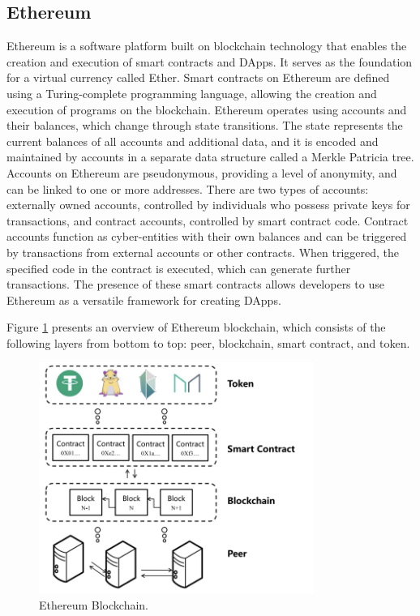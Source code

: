 \subsection{Ethereum}
Ethereum is a software platform built on blockchain technology that enables the creation and execution of smart contracts and  \ac{DApps}. It serves as the foundation for a virtual currency called Ether. Smart contracts on Ethereum are defined using a Turing-complete programming language, allowing the creation and execution of programs on the blockchain. Ethereum operates using accounts and their balances, which change through state transitions. The state represents the current balances of all accounts and additional data, and it is encoded and maintained by accounts in a separate data structure called a Merkle Patricia tree. Accounts on Ethereum are pseudonymous, providing a level of anonymity, and can be linked to one or more addresses.
There are two types of accounts: externally owned accounts, controlled by individuals who possess private keys for transactions, and contract accounts, controlled by smart contract code. Contract accounts function as cyber-entities with their own balances and can be triggered by transactions from external accounts or other contracts. When triggered, the specified code in the contract is executed, which can generate further transactions. The presence of these smart contracts allows developers to use Ethereum as a versatile framework for creating \ac{DApps}.

Figure \ref{fig:Ethereum Blockchain} presents an overview of Ethereum blockchain, which
consists of the following layers from bottom to top: peer,
blockchain, smart contract, and token.
\begin{figure}[H]
 \centering
  \includegraphics[width=0.8\textwidth]{Overview of Ethereum.png}
  \caption{Ethereum Blockchain.}
  \label{fig:Ethereum Blockchain}
\end{figure}

